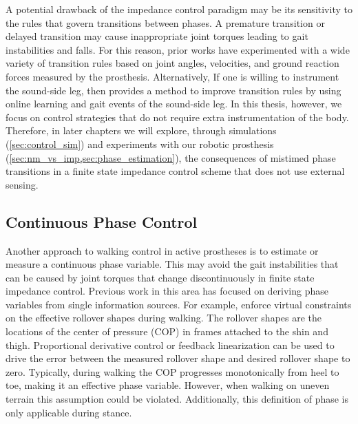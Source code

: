A potential drawback of the impedance control paradigm may be its sensitivity to
the rules that govern transitions between phases. A premature transition or
delayed transition may cause inappropriate joint torques leading to gait
instabilities and falls. For this reason, prior works have experimented with a
wide variety of transition rules based on joint angles, velocities, and ground
reaction forces measured by the prosthesis. Alternatively, If one is willing to
instrument the sound-side leg, then \citet{liu2014improving} provides a method
to improve transition rules by using online learning and gait events of the
sound-side leg. In this thesis, however, we focus on control strategies that do
not require extra instrumentation of the body. Therefore, in later chapters we
will explore, through simulations (\cref{sec:control_sim}) and experiments with
our robotic prosthesis (\cref{sec:nm_vs_imp,sec:phase_estimation}), the
consequences of mistimed phase transitions in a finite state impedance control
scheme that does not use external sensing.

\subsection{Continuous Phase Control}\label{sec:back_walk_cont_phase}
Another approach to walking control in active prostheses is to estimate or
measure a continuous phase variable. This may avoid the gait instabilities that
can be caused by joint torques that change discontinuously in finite state
impedance control. Previous work in this area has focused on deriving phase
variables from single information sources. For example, \citet{gregg2014virtual}
enforce virtual constraints on the effective rollover shapes during walking.
The rollover shapes are the locations of the center of pressure (COP) in frames
attached to the shin and thigh. Proportional derivative control or feedback
linearization can be used to drive the error between the measured rollover shape
and desired rollover shape to zero. Typically, during walking the COP progresses
monotonically from heel to toe, making it an effective phase variable. However,
when walking on uneven terrain this assumption could be violated. Additionally,
this definition of phase is only applicable during stance.

